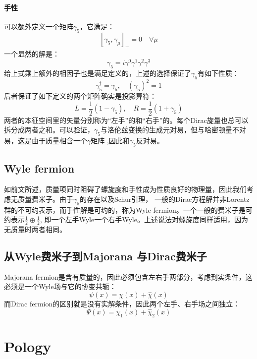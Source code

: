 \documentclass[12pt, a4paper, oneside]{ctexbook}
\def\gm{$ \gamma $矩阵 }
\begin{document}
	\paragraph*{手性}
	可以额外定义一个矩阵$ \gamma_5 $，它满足：
	\begin{equation}
		\left[\gamma_5, \gamma_\mu\right]_{+}=0 \quad \forall \mu
	\end{equation} 
	一个显然的解是：
	\begin{equation}
		\gamma_5=i \gamma^0 \gamma^1 \gamma^2 \gamma^3
	\end{equation}
	给上式乘上额外的相因子也是满足定义的，上述的选择保证了$ \gamma_5 $有如下性质：
	\begin{equation}
		\gamma_5^{\dagger}=\gamma_5, \quad\left(\gamma_5\right)^2=1
	\end{equation} 
	后者保证了如下定义的两个矩阵确实是投影算符：
	\begin{equation}
		L=\frac{1}{2}\left(1-\gamma_5\right), \quad R=\frac{1}{2}\left(1+\gamma_5\right)
	\end{equation}
	两者的本征空间里的矢量分别称为“左手”的和“右手”的。每个Dirac旋量也总可以拆分成两者之和。可以验证，$ \gamma_5 $与洛伦兹变换的生成元对易，但与哈密顿量不对易，这是由于质量相含一个\gm ,因此和$ \gamma_5 $反对易。
	\subsection{Wyle fermion}
	如前文所述，质量项同时阻碍了螺旋度和手性成为性质良好的物理量，因此我们考虑无质量费米子。由于$ \gamma_5 $的存在以及Schur引理，
	一般的Dirac方程解并非Lorentz群的不可约表示，而手性解是可约的，称为Wyle fermion。一个一般的费米子是可约表示$ \frac{1}{2}\oplus\frac{1}{2} $,
	即一个左手Wyle一个右手Wyle。上述说法对螺旋度同样适用，因为无质量时两者相同。
	\subsection{从Wyle费米子到Majorana 与Dirac费米子}
	Majorana fermion是含有质量的，因此必须包含左右手两部分，考虑到实条件，这必须是一个Wyle场与它的协变共轭：
	\begin{equation}
		\psi(x)=\chi(x)+\widehat{\chi}(x)
	\end{equation}
	而Dirac fermion的区别就是没有实解条件，因此两个左手、右手场之间独立：
	\begin{equation}
		\Psi(x)=\chi_1(x)+\widehat{\chi}_2(x)
	\end{equation}
	\section{Pology}
\end{document}
